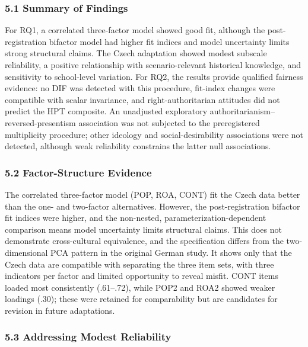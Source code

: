 \documentclass[
  12pt,
]{article}
\newcommand{\Loc}[1]{\linelabel{loc:#1}}
\newcommand{\LocEnd}[1]{\linelabel{loc:#1:end}}
\begin{document}
\hypertarget{summary-of-findings}{%
\subsubsection{5.1 Summary of Findings}\label{summary-of-findings}}

For RQ1, a correlated three-factor model showed good fit, although the
post-registration bifactor model had higher fit indices and model uncertainty
limits strong structural claims. The Czech adaptation showed modest subscale
reliability, a positive relationship with scenario-relevant historical
knowledge, and sensitivity to school-level variation. For RQ2, the results
provide qualified fairness evidence: no DIF was detected with this procedure,
fit-index changes were compatible with scalar invariance, and
right-authoritarian attitudes did not predict the HPT composite. \Loc{s51-exploratory}An unadjusted exploratory authoritarianism--reversed-presentism association was not subjected to the preregistered multiplicity procedure; other ideology and social-desirability associations were not detected, although weak reliability constrains the latter null associations.\LocEnd{s51-exploratory}

\hypertarget{factor-structure-evidence}{%
\subsubsection{5.2 Factor-Structure Evidence}\label{factor-structure-evidence}}

The correlated three-factor model (POP, ROA, CONT) fit the Czech data better
than the one- and two-factor alternatives. However, the
post-registration bifactor fit indices were higher, and the non-nested,
parameterization-dependent comparison means model uncertainty limits structural
claims. This does not demonstrate cross-cultural equivalence, and the
specification differs from the two-dimensional PCA pattern in the original
German study. It shows only that the Czech data are compatible with separating
the three item sets, with three indicators per factor and limited opportunity
to reveal misfit. CONT items loaded most consistently (.61--.72), while POP2 and
ROA2 showed weaker loadings (.30); these were retained for comparability but
are candidates for revision in future adaptations.

\hypertarget{addressing-modest-reliability}{%
\subsubsection{5.3 Addressing Modest Reliability}\label{addressing-modest-reliability}}
\end{document}
